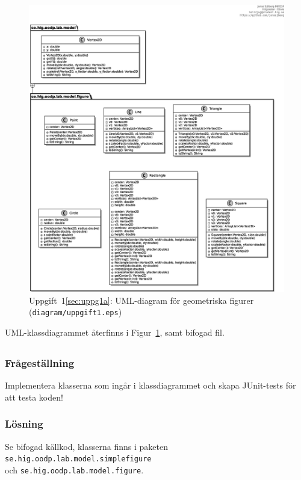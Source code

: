\begin{figure}[htbp]
\centering
\includegraphics[width=\linewidth]{diagram/uppgift1.eps}
\caption{Uppgift~1\ref{sec:uppg1a}: UML-diagram för geometriska figurer
(\texttt{diagram/uppgift1.eps})}
\label{fig:uppg1a}
\end{figure}

\par UML-klassdiagrammet återfinns i Figur~\ref{fig:uppg1a}, samt bifogad fil.


\subsection{}\label{sec:uppg1b}
\subsubsection*{Frågeställning}
Implementera klasserna som ingår i klassdiagrammet och skapa JUnit-tests för
att testa koden!

\subsubsection*{Lösning}
Se bifogad källkod, klasserna finns i paketen
\texttt{se.hig.oodp.lab.model.simplefigure} \\ och 
\texttt{se.hig.oodp.lab.model.figure}.



